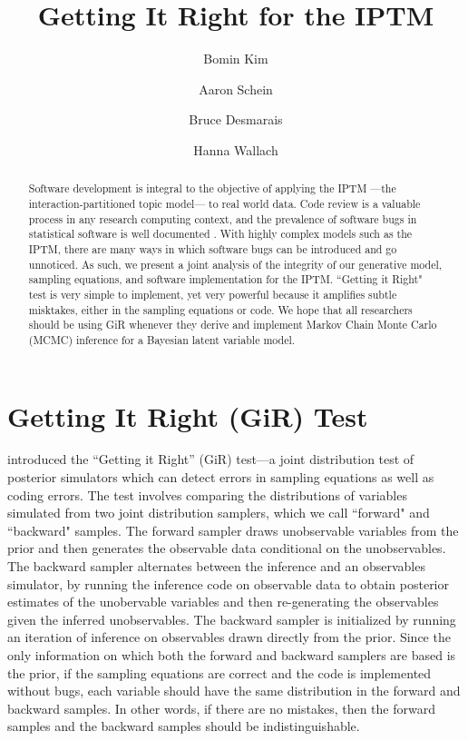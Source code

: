 \documentclass[a4paper]{article}
\title{Getting It Right for the IPTM}
\author[1]{Bomin Kim}
\author[3]{Aaron Schein}
\author[1]{Bruce Desmarais}
\author[2,3]{Hanna Wallach}
\affil[1]{Pennsylvania State University}
\affil[2]{Microsoft Research NYC}
\affil[3]{University of Massachusetts Amherst}
\begin{document}
\setlength{\parindent}{0pt}
\maketitle
\begin{abstract}
	
	\noindent Software development is integral to the objective of applying the IPTM ---the interaction-partitioned topic model--- to real world data. Code review is a valuable process in any research computing context, and the prevalence of software bugs in statistical software is well documented \citep[e.g., ][]{altman2004numerical,mccullough2009accuracy}.  With highly complex models such as the IPTM, there are many ways in which software bugs can be introduced and go unnoticed. As such, we present a joint analysis of the integrity of our generative model, sampling equations, and software implementation for the IPTM. ``Getting it Right" \citep{geweke2004getting} test is very simple to implement, yet very powerful because it amplifies subtle
	misktakes, either in the sampling equations or code. We hope that all researchers should be using GiR whenever they derive and implement Markov Chain Monte Carlo (MCMC) inference for a Bayesian latent variable model.
\end{abstract}
  \section{Getting It Right (GiR) Test}
 \cite{geweke2004getting} introduced the ``Getting it Right'' (GiR) test---a joint distribution test of posterior simulators which can detect errors in sampling equations as well as coding errors.  The test involves comparing the distributions of variables simulated from two joint distribution samplers, which we call ``forward" and ``backward" samples. The forward sampler draws unobservable variables from the prior and then generates the observable data conditional on the unobservables. The backward sampler alternates between the inference and an observables simulator, by running the inference code on observable data to obtain posterior estimates of the unobervable variables and then re-generating the observables given the inferred unobservables. The backward sampler is initialized by running an iteration of inference on observables drawn directly from the prior. Since the only information on which both the forward and backward samplers are based is the prior, if the sampling equations are correct and the code is implemented without bugs, each variable should have the same distribution in the forward and backward samples. In other words, if there are no mistakes, then the
 forward samples and the backward samples should be indistinguishable.
\end{document}
